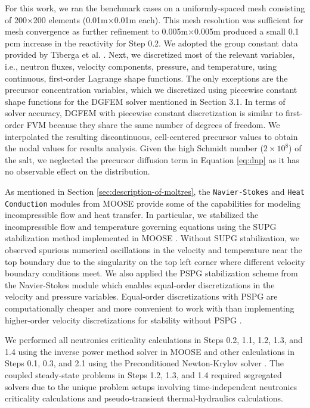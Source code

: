 For this work, we ran the benchmark cases on a uniformly-spaced mesh consisting
of 200$\times$200 elements (0.01m$\times$0.01m each). This mesh resolution was
sufficient for
mesh convergence as further refinement to 0.005m$\times$0.005m produced a
small 0.1 pcm increase in the reactivity for Step 0.2. We adopted the group
constant data provided by Tiberga et al. \cite{tiberga_results_2020}. Next, we
discretized most of the relevant variables, i.e., neutron fluxes, velocity
components, pressure, and temperature, using continuous, first-order Lagrange
shape functions. The only exceptions are the precursor concentration variables,
which we discretized using piecewise constant shape functions for the
\gls{DGFEM} solver mentioned in Section 3.1. In terms of solver accuracy,
\gls{DGFEM} with piecewise constant discretization is similar to first-order
\gls{FVM} because they share the same
number of degrees of freedom. We interpolated the resulting discontinuous,
cell-centered precursor values to obtain the nodal values for results
analysis. Given the high Schmidt number ($2\times10^8$)
\cite{tiberga_results_2020} of the salt, we neglected the precursor diffusion
term in Equation \ref{eq:dnp} as it has no observable effect on the
distribution.

As mentioned in Section \ref{sec:description-of-moltres}, the
\texttt{Navier-Stokes} and \texttt{Heat} \texttt{Conduction} modules from
\gls{MOOSE} provide some of the capabilities for
modeling incompressible flow and heat transfer. In particular, we stabilized
the incompressible flow and temperature governing equations using the
\gls{SUPG} stabilization method implemented in \gls{MOOSE}
\cite{peterson_overview_2018}. Without \gls{SUPG} stabilization, we
observed spurious numerical oscillations in the velocity and temperature near
the top boundary due to the singularity on the top left corner where different
velocity boundary conditions meet. We also applied the \gls{PSPG} stabilization
scheme \cite{hughes_new_1986} from the Navier-Stokes module
\cite{peterson_overview_2018}
which enables equal-order discretizations in the velocity and pressure
variables. Equal-order discretizations with \gls{PSPG} are computationally
cheaper and more convenient to work with than implementing higher-order
velocity discretizations for stability without \gls{PSPG}
\cite{chapelle_inf-sup_1993}.

We performed all neutronics criticality calculations in Steps 0.2, 1.1, 1.2,
1.3, and 1.4 using the inverse power method solver in \gls{MOOSE} and other
calculations in Steps 0.1, 0.3, and 2.1 using the Preconditioned Newton-Krylov
solver \cite{gaston_physics-based_2015}. The coupled steady-state problems in
Steps 1.2, 1.3, and 1.4 required segregated solvers due to the unique problem
setups involving time-independent neutronics criticality calculations
and pseudo-transient thermal-hydraulics calculations.

